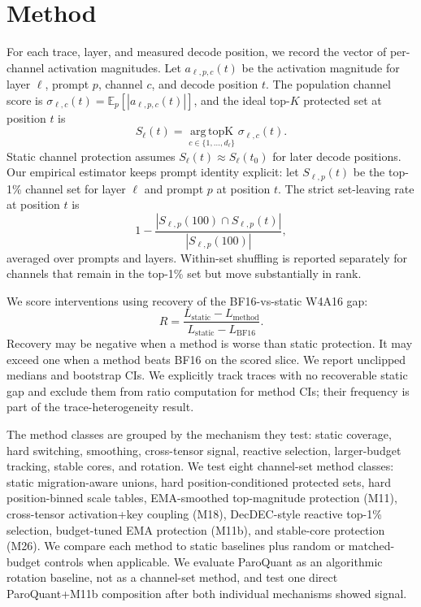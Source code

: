 \documentclass{article}
\begin{document}
\section{Method}

For each trace, layer, and measured decode position, we record the vector of per-channel activation magnitudes. Let $a_{\ell,p,c}(t)$ be the activation magnitude for layer $\ell$, prompt $p$, channel $c$, and decode position $t$. The population channel score is $\sigma_{\ell,c}(t)=\mathbb{E}_{p}[|a_{\ell,p,c}(t)|]$, and the ideal top-$K$ protected set at position $t$ is
\[
  S_{\ell}(t)=\operatorname*{arg\,topK}_{c \in \{1,\ldots,d_\ell\}}\sigma_{\ell,c}(t).
\]
Static channel protection assumes $S_{\ell}(t)\approx S_{\ell}(t_0)$ for later decode positions. Our empirical estimator keeps prompt identity explicit: let $S_{\ell,p}(t)$ be the top-1\% channel set for layer $\ell$ and prompt $p$ at position $t$. The strict set-leaving rate at position $t$ is
\begin{equation}
  1 - \frac{|S_{\ell,p}(100) \cap S_{\ell,p}(t)|}{|S_{\ell,p}(100)|},
\end{equation}
averaged over prompts and layers. Within-set shuffling is reported separately for channels that remain in the top-1\% set but move substantially in rank.

We score interventions using recovery of the BF16-vs-static W4A16 gap:
\begin{equation}
  R = \frac{L_{\text{static}} - L_{\text{method}}}{L_{\text{static}} - L_{\text{BF16}}}.
\end{equation}
Recovery may be negative when a method is worse than static protection. It may exceed one when a method beats BF16 on the scored slice. We report unclipped medians and bootstrap CIs. We explicitly track traces with no recoverable static gap and exclude them from ratio computation for method CIs; their frequency is part of the trace-heterogeneity result.

The method classes are grouped by the mechanism they test: static coverage, hard switching, smoothing, cross-tensor signal, reactive selection, larger-budget tracking, stable cores, and rotation. We test eight channel-set method classes: static migration-aware unions, hard position-conditioned protected sets, hard position-binned scale tables, EMA-smoothed top-magnitude protection (M11), cross-tensor activation+key coupling (M18), DecDEC-style reactive top-1\% selection, budget-tuned EMA protection (M11b), and stable-core protection (M26). We compare each method to static baselines plus random or matched-budget controls when applicable. We evaluate ParoQuant as an algorithmic rotation baseline, not as a channel-set method, and test one direct ParoQuant+M11b composition after both individual mechanisms showed signal.
\end{document}
